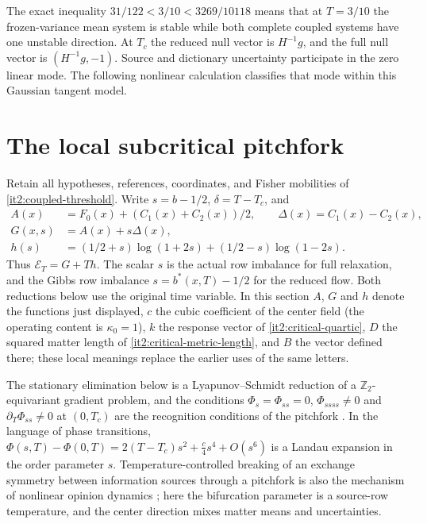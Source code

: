 The exact inequality $31/122<3/10<3269/10118$ means that at $T=3/10$ the frozen-variance mean system is stable while both complete coupled systems have one unstable direction. At $T_c$ the reduced null vector is $H^{-1}g$, and the full null vector is $(H^{-1}g,-1)$. Source and dictionary uncertainty participate in the zero linear mode. The following nonlinear calculation classifies that mode within this Gaussian tangent model.

\section{The local subcritical pitchfork}
\label{it2:ch-critical-mode}

Retain all hypotheses, references, coordinates, and Fisher mobilities of \cref{it2:coupled-threshold}. Write $s=b-1/2$, $\delta=T-T_c$, and
\begin{equation}
 \begin{aligned}
 A(x)&=F_0(x)+(C_1(x)+C_2(x))/2,\qquad \Delta(x)=C_1(x)-C_2(x),\\
 G(x,s)&=A(x)+s\Delta(x),\\
 h(s)&=(1/2+s)\log(1+2s)+(1/2-s)\log(1-2s).
 \end{aligned}
 \label{it2:critical-functions}
\end{equation}
Thus $\mathcal E_T=G+Th$. The scalar $s$ is the actual row imbalance for full relaxation, and the Gibbs row imbalance $s=b^*(x,T)-1/2$ for the reduced flow. Both reductions below use the original time variable. In this section $A$, $G$ and $h$ denote the functions just displayed, $c$ the cubic coefficient of the center field (the operating content is $\kappa_0=1$), $k$ the response vector of \cref{it2:critical-quartic}, $D$ the squared matter length of \cref{it2:critical-metric-length}, and $B$ the vector defined there; these local meanings replace the earlier uses of the same letters.

The stationary elimination below is a Lyapunov--Schmidt reduction of a $\mathbb Z_2$-equivariant gradient problem, and the conditions $\Phi_s=\Phi_{ss}=0$, $\Phi_{ssss}\neq0$ and $\partial_T\Phi_{ss}\neq0$ at $(0,T_c)$ are the recognition conditions of the pitchfork \citep{GolubitskySchaeffer1985}. In the language of phase transitions, $\Phi(s,T)-\Phi(0,T)=2(T-T_c)s^2+\frac c4s^4+O(s^6)$ is a Landau expansion in the order parameter $s$. Temperature-controlled breaking of an exchange symmetry between information sources through a pitchfork is also the mechanism of nonlinear opinion dynamics \citep{BizyaevaFranciLeonard2023}; here the bifurcation parameter is a source-row temperature, and the center direction mixes matter means and uncertainties.

